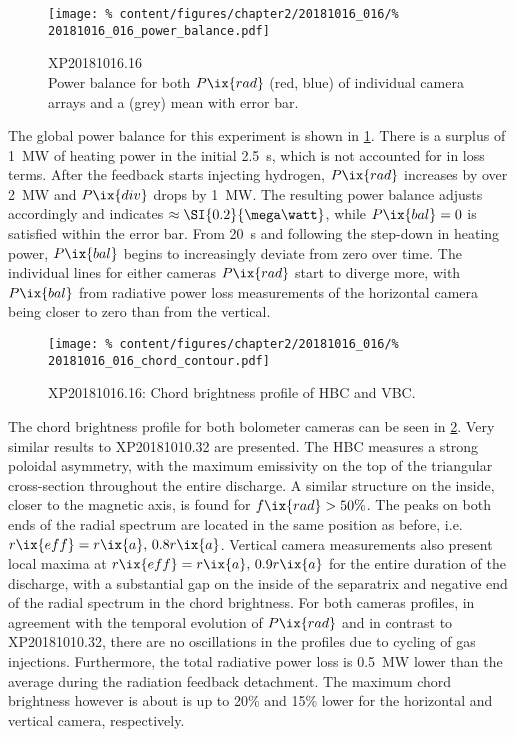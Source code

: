 %
                \begin{figure}[t]%
                    \centering%
                    \texttt{[image: \%
                        content/figures/chapter2/20181016\_016/\%
                        20181016\_016\_power\_balance.pdf]}%
                    \caption{XP20181016.16\\%
                        Power balance for both $P\ix{rad}$ (red, blue) of individual camera arrays and a (grey) mean with error bar.}\label{fig:20181016.16_balance}%
                \end{figure}%
%
                The global power balance for this experiment is shown in \cref{fig:20181016.16_balance}. There is a surplus of \SI{1}{\mega\watt} of heating power in the initial \SI{2.5}{\second}, which is not accounted for in loss terms. After the feedback starts injecting hydrogen, $P\ix{rad}$ increases by over \SI{2}{\mega\watt} and $P\ix{div}$ drops by \SI{1}{\mega\watt}. The resulting power balance adjusts accordingly and indicates $\approx\-\SI{0.2}{\mega\watt}$, while $P\ix{bal}=0$ is satisfied within the error bar. From \SI{20}{\second} and following the step-down in heating power, $P\ix{bal}$ begins to increasingly deviate from zero over time. The individual lines for either cameras $P\ix{rad}$ start to diverge more, with $P\ix{bal}$ from radiative power loss measurements of the horizontal camera being closer to zero than from the vertical.\\%
%
                \begin{figure}[t]%
                    \centering%
                    \texttt{[image: \%
                        content/figures/chapter2/20181016\_016/\%
                        20181016\_016\_chord\_contour.pdf]}%
                    \caption{XP20181016.16: %
                        Chord brightness profile of HBC and VBC.}\label{fig:20181016.16_CP}%
                \end{figure}%
%
                The chord brightness profile for both bolometer cameras can be seen in \cref{fig:20181016.16_CP}. Very similar results to  XP20181010.32 are presented. The HBC measures a strong poloidal asymmetry, with the maximum emissivity on the top of the triangular cross-section throughout the entire discharge. A similar structure on the inside, closer to the magnetic axis, is found for $f\ix{rad}>50\%$. The peaks on both ends of the radial spectrum are located in the same position as before, i.e. $r\ix{eff}=r\ix{a},\,0.8r\ix{a}$. Vertical camera measurements also present local maxima at $r\ix{eff}=\-r\ix{a},\,0.9r\ix{a}$ for the entire duration of the discharge, with a substantial gap on the inside of the separatrix and negative end of the radial spectrum in the chord brightness. For both cameras profiles, in agreement with the temporal evolution of $P\ix{rad}$ and in contrast to XP20181010.32, there are no oscillations in the profiles due to cycling of gas injections. Furthermore, the total radiative power loss is \SI{0.5}{\mega\watt} lower than the average during the radiation feedback detachment. The maximum chord brightness however is about is up to 20\% and 15\% lower for the horizontal and vertical camera, respectively.\\%

